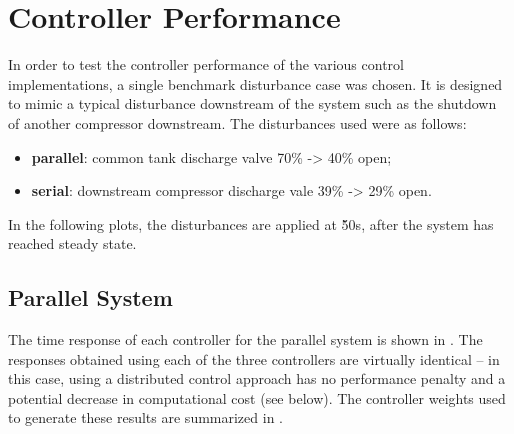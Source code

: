 \section{Controller Performance}
\label{sec:results:performance}

\newif\ifmakeplots
\makeplotstrue


In order to test the controller performance of the various control implementations, a single benchmark disturbance case was chosen.
It is designed to mimic a typical disturbance downstream of the system such as the shutdown of another compressor downstream.
The disturbances used were as follows:

\begin{itemize}
  \item \textbf{parallel}: common tank discharge valve 70\% -> 40\% open;
  \item \textbf{serial}: downstream compressor discharge vale 39\% -> 29\% open.
\end{itemize}
In the following plots, the disturbances are applied at \u{50}{s}, after the system has reached steady state.


\subsection{Parallel System}
\label{sec:results:performance:parallel}


The time response of each controller for the parallel system is shown in .
The responses obtained using each of the three controllers are virtually identical -- in this case, using a distributed control approach has no performance penalty and a potential decrease in computational cost (see below).
The controller weights used to generate these results are summarized in .

